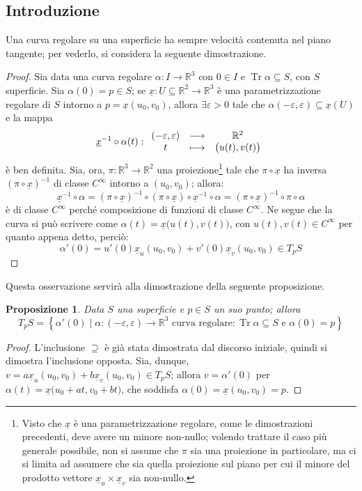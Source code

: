 \documentclass[12pt]{scrartcl}
\theoremstyle{style}
\newtheorem{prop}{Proposizione}[section]
\numberwithin{equation}{subsection}
\begin{document}
\subsection{Introduzione}
Una curva regolare su una superficie ha sempre velocit\`a contenuta nel piano tangente; per vederlo, si considera la seguente dimostrazione.
\begin{proof}
Sia data una curva regolare $\alpha  : I \to \mathbb{R}^3$ con $0 \in I$ e $\operatorname{Tr} \alpha \subseteq S$, con $S$ superficie.
Sia $\alpha (0) = p \in S$; se $\underline{x} : U \subseteq \mathbb{R}^2 \to \mathbb{R}^3$ \`e una parametrizzazione regolare di $S$ intorno a $p = \underline{x}(u_0,v_0)$, allora $\exists \varepsilon >0$ tale che $\alpha (-\varepsilon ,\varepsilon ) \subseteq \underline{x}(U)$ e la mappa
\[
\underline{x}^{-1}\circ \alpha (t):
\begin{array}
	{c c c}
	(-\varepsilon ,\varepsilon )&\longrightarrow & \mathbb{R}^2\\
t&\longmapsto &\big(u(t) , v(t)\big)
\end{array}
\] 
\`e ben definita.
Sia, ora, $\pi: \mathbb{R}^3 \to \mathbb{R}^2$ una proiezione\footnote{Visto che $\underline{x}$ \`e una parametrizzazione regolare, come le dimostrazioni precedenti, deve avere un minore non-nullo; volendo trattare il caso pi\`u generale possibile, non si assume che $\pi$ sia una proiezione in particolare, ma ci si limita ad assumere che sia quella proiezione sul piano per cui il minore del prodotto vettore $\underline{x}_u \times \underline{x}_v$ sia non-nullo.} tale che $\pi\circ \underline{x}$ ha inversa $(\pi\circ \underline{x})^{-1}$ di classe $C^\infty$ intorno a $(u_0,v_0)$; allora:
\[
\underline{x}^{-1}\circ \alpha  = (\pi\circ \underline{x})^{-1}\circ (\pi\circ \underline{x}) \circ \underline{x}^{-1}\circ \alpha  = (\pi\circ \underline{x})^{-1} \circ \pi \circ \alpha  
\] 
\`e di classe $C^\infty$ perch\'e composizione di funzioni di classe $C^\infty$.
Ne segue che la curva si pu\`o scrivere come $\alpha (t) = \underline{x}\big(u(t),v(t)\big)$, con $u(t), v(t) \in C^\infty$ per quanto appena detto, perci\`o:
\[
\alpha '(0) = u'(0) \underline{x}_u(u_0,v_0) + v'(0) \underline{x}_v(u_0,v_0) \in  T_p S
\] 
\end{proof}
Questa osservazione servir\`a alla dimostrazione della seguente proposizione.
\begin{prop}
	Data $S$ una superficie e $p \in S$ un suo punto; allora
	\[
	T_pS = \left\{ \alpha '(0)  \mid \alpha :(-\varepsilon , \varepsilon ) \to \mathbb{R}^3 \text{ curva regolare}:\operatorname{Tr} \alpha \subseteq S \text{ e } \alpha (0) = p \right\} 
	\] 
\end{prop}
\begin{proof}
	L'inclusione $\supseteq$ \`e gi\`a stata dimostrata dal discorso iniziale, quindi si dimostra l'inclusione opposta.
	Sia, dunque, $v = a \underline{x}_u(u_0,v_0) + b \underline{x}_v (u_0,v_0) \in T_pS$; allora $v = \alpha '(0)$ per $\alpha (t) = \underline{x}\big(u_0+ at, v_0+bt\big)$, che soddisfa $\alpha (0) = \underline{x}(u_0,v_0) = p$.
\end{proof}
\end{document}
